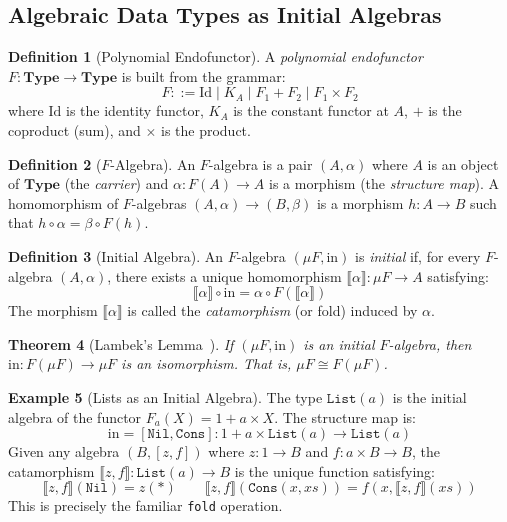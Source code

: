 \documentclass[11pt]{article}
\newtheorem{theorem}{Theorem}[section]
\theoremstyle{definition}
\newtheorem{definition}[theorem]{Definition}
\newtheorem{example}[theorem]{Example}
\theoremstyle{remark}
\newcommand{\Type}{\mathbf{Type}}
\newcommand{\sem}[1]{\llbracket #1 \rrbracket}
\begin{document}
\subsection{Algebraic Data Types as Initial Algebras}
\label{sec:formal:initial-algebras}

\begin{definition}[Polynomial Endofunctor]
\label{def:poly-functor}
A \emph{polynomial endofunctor} $F : \Type \to \Type$ is built from
the grammar:
\[
  F ::= \mathrm{Id} \mid K_A \mid F_1 + F_2 \mid F_1 \times F_2
\]
where $\mathrm{Id}$ is the identity functor, $K_A$ is the constant
functor at $A$, $+$ is the coproduct (sum), and $\times$ is the
product.
\end{definition}

\begin{definition}[$F$-Algebra]
\label{def:f-algebra}
An $F$-algebra is a pair $(A, \alpha)$ where $A$ is an object of
$\Type$ (the \emph{carrier}) and $\alpha : F(A) \to A$ is a morphism
(the \emph{structure map}).  A homomorphism of $F$-algebras
$(A, \alpha) \to (B, \beta)$ is a morphism $h : A \to B$ such that
$h \circ \alpha = \beta \circ F(h)$.
\end{definition}

\begin{definition}[Initial Algebra]
\label{def:initial-algebra}
An $F$-algebra $(\mu F, \mathrm{in})$ is \emph{initial} if, for every
$F$-algebra $(A, \alpha)$, there exists a unique homomorphism
$\sem{\alpha} : \mu F \to A$ satisfying:
\[
  \sem{\alpha} \circ \mathrm{in} = \alpha \circ F(\sem{\alpha})
\]
The morphism $\sem{\alpha}$ is called the \emph{catamorphism} (or
fold) induced by $\alpha$.
\end{definition}

\begin{theorem}[Lambek's Lemma~\cite{lambek1968fixpoint}]
\label{thm:lambek}
If $(\mu F, \mathrm{in})$ is an initial $F$-algebra, then
$\mathrm{in} : F(\mu F) \to \mu F$ is an isomorphism.  That is,
$\mu F \cong F(\mu F)$.
\end{theorem}

\begin{example}[Lists as an Initial Algebra]
\label{ex:list-initial}
The type $\texttt{List}(a)$ is the initial algebra of the functor
$F_a(X) = 1 + a \times X$.  The structure map is:
\[
  \mathrm{in} = [\texttt{Nil}, \texttt{Cons}] : 1 + a \times \texttt{List}(a) \to \texttt{List}(a)
\]
Given any algebra $(B, [z, f])$ where $z : 1 \to B$ and $f : a \times
B \to B$, the catamorphism $\sem{z, f} : \texttt{List}(a) \to B$ is
the unique function satisfying:
\[
  \sem{z, f}(\texttt{Nil}) = z(\ast) \qquad
  \sem{z, f}(\texttt{Cons}(x, xs)) = f(x, \sem{z, f}(xs))
\]
This is precisely the familiar \texttt{fold} operation.
\end{example}
\end{document}
